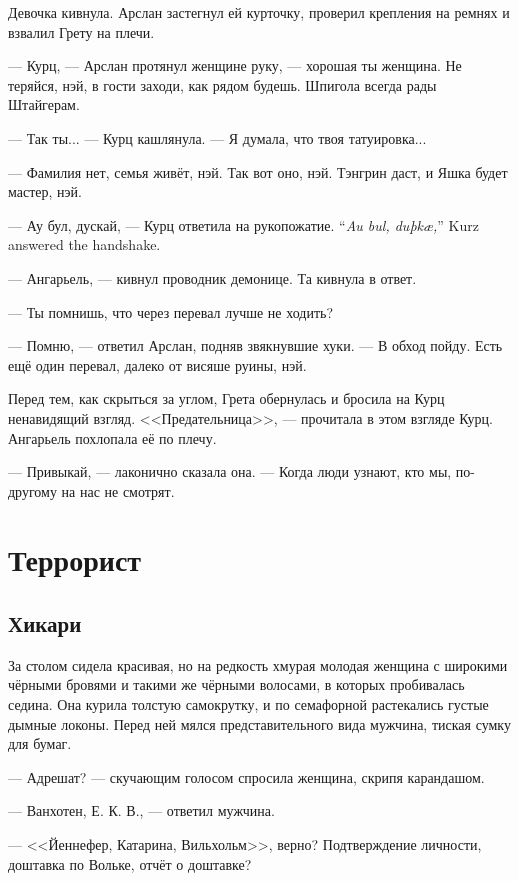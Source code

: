Девочка кивнула.
Арслан застегнул ей курточку, проверил крепления на ремнях и взвалил Грету на плечи.

--- Курц, --- Арслан протянул женщине руку, --- хорошая ты женщина.
Не теряйся, нэй, в гости заходи, как рядом будешь.
Шпигола всегда рады Штайгерам.

--- Так ты... --- Курц кашлянула.
--- Я думала, что твоя татуировка...

--- Фамилия нет, семья живёт, нэй.
Так вот оно, нэй.
Тэнгрин даст, и Яшка будет мастер, нэй.

{--- Ау бул, дускай, --- Курц ответила на рукопожатие.}
{``\textit{Au bul, duþk\ae{},}'' Kurz answered the handshake.}

--- Ангарьель, --- кивнул проводник демонице.
Та кивнула в ответ.

--- Ты помнишь, что через перевал лучше не ходить?

--- Помню, --- ответил Арслан, подняв звякнувшие хуки.
--- В обход пойду.
Есть ещё один перевал, далеко от висяше руины, нэй.

Перед тем, как скрыться за углом, Грета обернулась и бросила на Курц ненавидящий взгляд.
<<Предательница>>, --- прочитала в этом взгляде Курц.
Ангарьель похлопала её по плечу.

--- Привыкай, --- лаконично сказала она.
--- Когда люди узнают, кто мы, по-другому на нас не смотрят.

\chapter{Террорист}

\section{Хикари}

За столом сидела красивая, но на редкость хмурая молодая женщина с широкими чёрными бровями и такими же чёрными волосами, в которых пробивалась седина.
Она курила толстую самокрутку, и по семафорной растекались густые дымные локоны.
Перед ней мялся представительного вида мужчина, тиская сумку для бумаг.

--- Адрешат? --- скучающим голосом спросила женщина, скрипя карандашом.

--- Ванхотен, Е. К. В., --- ответил мужчина.

--- <<Йеннефер, Катарина, Вильхольм>>, верно?
Подтверждение личности, доштавка по Вольке, отчёт о доштавке?

